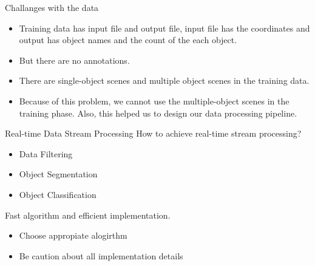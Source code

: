 \documentclass[9pt]{beamer}
\begin{document}

\begin{frame}[fragile]{Challanges with the data}
	\begin{itemize}
		\item Training data has input file and output file, input file has the coordinates and output has object names and the count of the each object.
		\item But there are no annotations.
		\item There are single-object scenes and multiple object scenes in the training data.
		\item Because of this problem, we cannot use the multiple-object scenes in the training phase. Also, this helped us to design our data processing pipeline.
	\end{itemize}
\end{frame}


\begin{frame}[fragile]{Real-time Data Stream Processing}
How to achieve real-time stream processing? 
	
\begin{itemize}
	\item {} Data Filtering
	\item {} Object Segmentation
	\item {} Object Classification
\end{itemize}

Fast algorithm and efficient implementation. 

\begin{itemize}
	\item Choose appropiate alogirthm
	\item Be caution about all implementation details
\end{itemize}

\end{frame}
\end{document}
